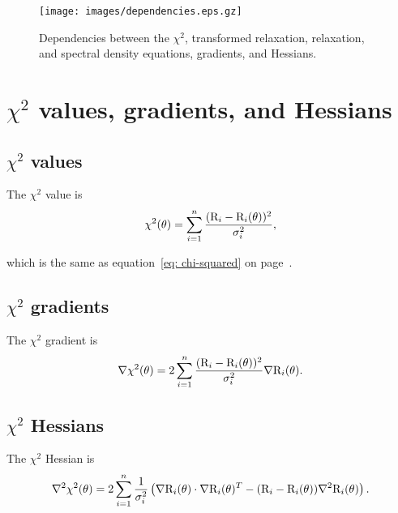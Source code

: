 \begin{figure}[!h]
\centerline{\texttt{[image: images/dependencies.eps.gz]}}
\caption[$\chi^2$ dependencies of the values, gradients, and Hessians]{Dependencies between the $\chi^2$, transformed relaxation, relaxation, and spectral density equations, gradients, and Hessians.}\label{fig: dependencies}
\end{figure}




\section{$\chi^2$ values, gradients, and Hessians}

\subsection{$\chi^2$ values}

The $\chi^2$ value is
\begin{equation}
 \chi^2(\theta) = \sum_{i=1}^n \frac{(\mathrm{R}_i - \mathrm{R}_i(\theta))^2}{\sigma_i^2},
\end{equation}

\noindent which is the same as equation~\eqref{eq: chi-squared} on page~\pageref{eq: chi-squared}.


\subsection{$\chi^2$ gradients}

The $\chi^2$ gradient is
\begin{equation}
 \nabla \chi^2(\theta) = 2 \sum_{i=1}^n \frac{(\mathrm{R}_i - \mathrm{R}_i(\theta))^2}{\sigma_i^2} \nabla \mathrm{R}_i(\theta).
\end{equation}


\subsection{$\chi^2$ Hessians}

The $\chi^2$ Hessian is
\begin{equation}
 \nabla^2 \chi^2(\theta) = 2 \sum_{i=1}^n \frac{1}{\sigma_i^2} \left(\nabla \mathrm{R}_i(\theta) \cdot \nabla \mathrm{R}_i(\theta)^T - (\mathrm{R}_i - \mathrm{R}_i(\theta)) \nabla^2 \mathrm{R}_i(\theta) \right).
\end{equation}




